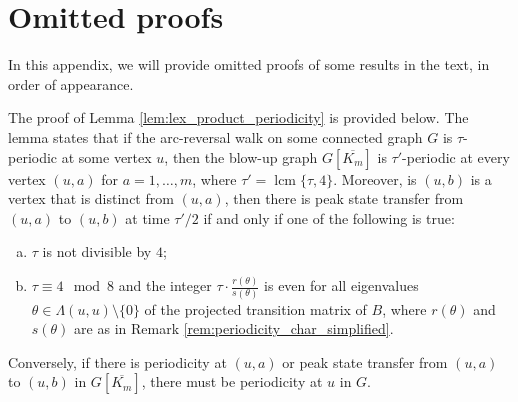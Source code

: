 \documentclass{article}
\numberwithin{equation}{section}
\DeclareMathOperator{\lcm}{lcm}
\begin{document}
\appendix 
\section{Omitted proofs}
\label{app:proofs}
In this appendix, we will provide omitted proofs of some results in the text, in order of appearance.

The proof of Lemma \ref{lem:lex_product_periodicity} is provided below. The lemma states that if the arc-reversal walk on some connected graph $G$ is $\tau$-periodic at some vertex $u$, then the blow-up graph $G[\overline{K_m}]$ is $\tau'$-periodic at every vertex $(u,a)$ for $a =1,\ldots,m$, where $\tau' = \lcm\{\tau,4\}$. Moreover, is $(u,b)$ is a vertex that is distinct from $(u,a)$, then there is peak state transfer from $(u,a)$ to $(u,b)$ at time $\tau'/2$ if and only if one of the following is true:
\begin{enumerate}[(a)]
\item $\tau$ is not divisible by $4$;
\item $\tau \equiv 4 \mod 8$ and the integer $\tau \cdot \frac{r(\theta)}{s(\theta)}$ is even for all eigenvalues $\theta \in \Lambda(u,u) \setminus \{0\}$ of the projected transition matrix of $B$, where $r(\theta)$ and $s(\theta)$ are as in Remark \ref{rem:periodicity_char_simplified}.
\end{enumerate}
Conversely, if there is periodicity at $(u,a)$ or peak state transfer from $(u,a)$ to $(u,b)$ in $G[\overline{K_m}]$, there must be periodicity at $u$ in $G$.
\end{document}

